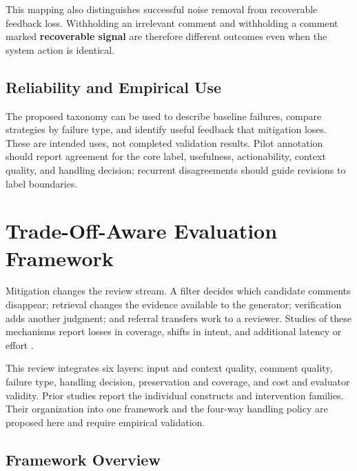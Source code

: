 \documentclass[10pt]{article}
\begin{document}
This mapping also distinguishes successful noise removal from recoverable feedback loss. Withholding an irrelevant comment and withholding a comment marked \textbf{recoverable signal} are therefore different outcomes even when the system action is identical.

\subsection{Reliability and Empirical Use}

The proposed taxonomy can be used to describe baseline failures, compare strategies by failure type, and identify useful feedback that mitigation loses. These are intended uses, not completed validation results. Pilot annotation should report agreement for the core label, usefulness, actionability, context quality, and handling decision; recurrent disagreements should guide revisions to label boundaries.




\section{Trade-Off-Aware Evaluation Framework}

Mitigation changes the review stream. A filter decides which candidate comments disappear; retrieval changes the evidence available to the generator; verification adds another judgment; and referral transfers work to a reviewer. Studies of these mechanisms report losses in coverage, shifts in intent, and additional latency or effort \cite{p04_kumar2026_swe_prbench,p07_olewicki2024_revmate,p10_sun2025_bitsai_cr,p18_bensghaier2025_curated_reviews,p35_mcaleese2024_llm_critics,p65_ameen2026_qasecclaw}.

This review integrates six layers: input and context quality, comment quality, failure type, handling decision, preservation and coverage, and cost and evaluator validity. Prior studies report the individual constructs and intervention families. Their organization into one framework and the four-way handling policy are proposed here and require empirical validation.

\subsection{Framework Overview}
\end{document}
